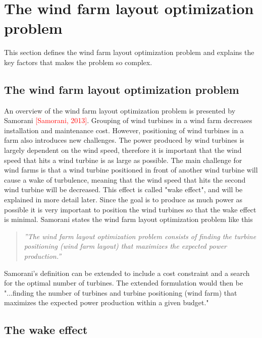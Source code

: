 \documentclass{article}
\begin{document}


\section{The wind farm layout optimization problem}


This section defines the wind farm layout optimization problem and explains the key factors that makes the problem so complex. 


\subsection{The wind farm layout optimization problem}


An overview of the wind farm layout optimization problem is presented by Samorani \textcolor{red}{[Samorani, 2013]}. Grouping of wind turbines in a wind farm decreases installation and maintenance cost. However, positioning of wind turbines in a farm also introduces new challenges. The power produced by wind turbines is largely dependent on the wind speed, therefore it is important that the wind speed that hits a wind turbine is as large as possible. The main challenge for wind farms is that a wind turbine positioned in front of another wind turbine will cause a wake of turbulence, meaning that the wind speed that hits the second wind turbine will be decreased. This effect is called "wake effect", and will be explained in more detail later. Since the goal is to produce as much power as possible it is very important to position the wind turbines so that the wake effect is minimal. Samorani states the wind farm layout optimization problem like this


\begin{quote}
\textit{''The wind farm layout optimization problem consists of finding the turbine positioning (wind farm layout) that maximizes the expected power production.''}
\end{quote}


\noindent Samorani's definition can be extended to include a cost constraint and a search for the optimal number of turbines. The extended formulation would then be "...finding the number of turbines and turbine positioning (wind farm) that maximizes the expected power production within a given budget."


\subsection{The wake effect}
\end{document}
